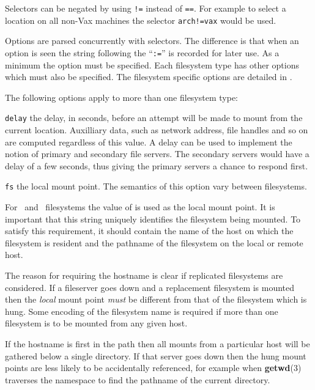 Selectors can be negated by using {\tt !=} instead of {\tt ==}.
For example to select a location
on all non-{\sc Vax} machines the selector {\tt arch!=vax} would be used. 

\label{options}

Options are parsed concurrently with selectors.  The difference is that
when an option is seen the string following the ``{\tt :=}'' is recorded for
later use.  As a minimum the  option must be specified.
Each filesystem type has other options which must also be specified.
The filesystem specific options are detailed in .

The following options apply to more than one filesystem type:
\begin{list}{}
{\setlength{\leftmargin}{1.2\labelwidth}}
\item[\tt delay\hfill]
the delay, in seconds, before an attempt will be made to mount from the current location.
Auxilliary data, such as network address, file handles and so on are computed
regardless of this value.
A delay can be used to implement the notion of primary and secondary file servers.
The secondary servers would have a delay of a few seconds,
thus giving the primary servers a chance to respond first.

\item[\tt fs\hfill]\label{mount location}
the local mount point.
The semantics of this option vary between filesystems.

For \NFS\ and \UFS\ filesystems the value of  is used as the local
mount point.  It is important that this string uniquely identifies the
filesystem being mounted.  To satisfy this requirement, it should contain the
name of the host on which the filesystem is resident and the pathname
of the filesystem on the local or remote host.

The reason for
requiring the hostname is clear if replicated filesystems are considered.
If a fileserver goes down and a replacement filesystem is mounted then the {\em local}
mount point {\em must} be different from that of the filesystem which
is hung.
Some encoding of the filesystem name is required if more than one filesystem
is to be mounted from any given host.

If the hostname is first in the path then all mounts from a particular
host will be gathered below a single directory.  If that server goes
down then the hung mount points are less likely to be accidentally referenced,
for example when {\bf getwd}(3) traverses the namespace to find the pathname
of the current directory.


\end{list}

